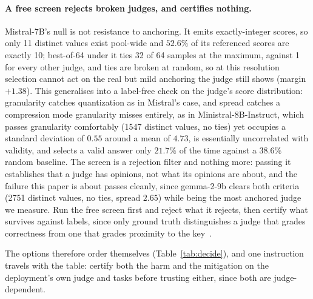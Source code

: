 \documentclass[11pt]{article}
\begin{document}
\paragraph{A free screen rejects broken judges, and certifies nothing.}
Mistral-7B's null is not resistance to anchoring.
It emits exactly-integer scores, so only 11 distinct values exist pool-wide and $52.6\%$ of its referenced scores are exactly 10; best-of-64 under it ties 32 of 64 samples at the maximum, against 1 for every other judge, and ties are broken at random, so at this resolution selection cannot act on the real but mild anchoring the judge still shows (margin $+1.38$).
This generalises into a label-free check on the judge's score distribution: granularity catches quantization as in Mistral's case, and spread catches a compression mode granularity misses entirely, as in Ministral-8B-Instruct, which passes granularity comfortably (1547 distinct values, no ties) yet occupies a standard deviation of $0.55$ around a mean of $4.73$, is essentially uncorrelated with validity, and selects a valid answer only $21.7\%$ of the time against a $38.6\%$ random baseline.
The screen is a rejection filter and nothing more: passing it establishes that a judge has opinions, not what its opinions are about, and the failure this paper is about passes cleanly, since gemma-2-9b clears both criteria (2751 distinct values, no ties, spread $2.65$) while being the most anchored judge we measure.
Run the free screen first and reject what it rejects, then certify what survives against labels, since only ground truth distinguishes a judge that grades correctness from one that grades proximity to the key~\cite{companionA}.

The options therefore order themselves (Table~\ref{tab:decide}), and one instruction travels with the table: certify both the harm and the mitigation on the deployment's own judge and tasks before trusting either, since both are judge-dependent.
\end{document}
